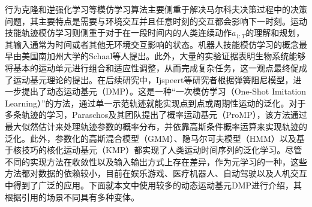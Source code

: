 行为克隆和逆强化学习等模仿学习算法主要侧重于解决马尔科夫决策过程中的决策问题，其主要特点是需要与环境交互并且任意时刻的交互都会影响下一时刻。运动技能轨迹模仿学习则侧重于对于在一段时间内的人类连续动作$a_{1:T}$的理解和规划，其输入通常为时间或者其他无环境交互影响的状态\cite{HuangJiQiRenYunDongGuiJiDeMoFangXueXiZongShu}。机器人技能模仿学习的概念最早由美国南加州大学的Schaal等人\cite{schaalImitationLearningRoute1999}提出。此外，大量的实验证据表明生物系统能够将基本的运动单元进行组合和适应性调整，从而完成复杂任务，这一观点最终促成了运动基元理论的提出\cite{saverianoDynamicMovementPrimitives2023}。在后续研究中，Ijspeert等研究者\cite{ijspeertDynamicalMovementPrimitives2013a,righettiDynamicHebbianLearning2006a}根据弹簧阻尼模型，进一步提出了动态运动基元（DMP）。这是一种“一次模仿学习（One-Shot Imitation Learning）”的方法，通过单一示范轨迹就能实现点到点或周期性运动的泛化。对于多条轨迹的学习，Paraschos及其团队提出了概率运动基元（ProMP），该方法通过最大似然估计来处理轨迹参数的概率分布，并依靠高斯条件概率运算来实现轨迹的泛化。此外，参数化的高斯混合模型（GMM）\cite{paraschosProbabilisticMovementPrimitives2013}、隐马尔可夫模型（HMM）\cite{rabinerIntroductionHiddenMarkov1986}以及基于核技巧的核化运动基元（KMP）\cite{huangKernelizedMovementPrimitives2019}都实现了人类运动时间序列的泛化学习。尽管不同的实现方法在收敛性以及输入输出方式上存在差异，作为元学习的一种，这些方法都对数据的依赖较小，目前在娱乐游戏、医疗机器人、自动驾驶以及人机交互中得到了广泛的应用。下面就本文中使用较多的动态运动基元DMP进行介绍，其根据引用的场景不同具有多种变体。


